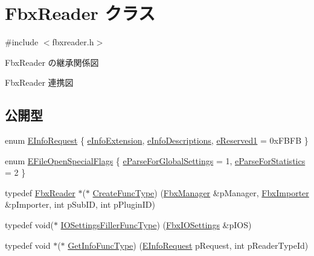\hypertarget{class_fbx_reader}{}\section{Fbx\+Reader クラス}
\label{class_fbx_reader}


{\ttfamily \#include $<$fbxreader.\+h$>$}



Fbx\+Reader の継承関係図


Fbx\+Reader 連携図
\subsection*{公開型}
\begin{DoxyCompactItemize}
\item 
enum \hyperlink{class_fbx_reader_a33badbb2641958ab0772ec2c06a71e11}{E\+Info\+Request} \{ \hyperlink{class_fbx_reader_a33badbb2641958ab0772ec2c06a71e11a03189cefb5f6d784e3af3760f4c89ebd}{e\+Info\+Extension}, 
\hyperlink{class_fbx_reader_a33badbb2641958ab0772ec2c06a71e11a6bc70d273a72ac7b0ac1ff679da40192}{e\+Info\+Descriptions}, 
\hyperlink{class_fbx_reader_a33badbb2641958ab0772ec2c06a71e11a347956bc041cb7614b8a9be1b388e4c2}{e\+Reserved1} = 0x\+F\+B\+FB
 \}
\item 
enum \hyperlink{class_fbx_reader_a1a14bd907bcda7dd48ba9b0a6236b7b8}{E\+File\+Open\+Special\+Flags} \{ \hyperlink{class_fbx_reader_a1a14bd907bcda7dd48ba9b0a6236b7b8a916239cfabb05bb13e64fab696226011}{e\+Parse\+For\+Global\+Settings} = 1, 
\hyperlink{class_fbx_reader_a1a14bd907bcda7dd48ba9b0a6236b7b8a31ba0d93719d2c2670ef2323447a8041}{e\+Parse\+For\+Statistics} = 2
 \}
\item 
typedef \hyperlink{class_fbx_reader}{Fbx\+Reader} $\ast$($\ast$ \hyperlink{class_fbx_reader_a83acaa910ced3876e5e232ff17f62c45}{Create\+Func\+Type}) (\hyperlink{class_fbx_manager}{Fbx\+Manager} \&p\+Manager, \hyperlink{class_fbx_importer}{Fbx\+Importer} \&p\+Importer, int p\+Sub\+ID, int p\+Plugin\+ID)
\item 
typedef void($\ast$ \hyperlink{class_fbx_reader_aa8d17b6ac89ea7229a3a1510fbccec73}{I\+O\+Settings\+Filler\+Func\+Type}) (\hyperlink{class_fbx_i_o_settings}{Fbx\+I\+O\+Settings} \&p\+I\+OS)
\item 
typedef void $\ast$($\ast$ \hyperlink{class_fbx_reader_a86477804a6ed54e7f99a1887aa50f256}{Get\+Info\+Func\+Type}) (\hyperlink{class_fbx_reader_a33badbb2641958ab0772ec2c06a71e11}{E\+Info\+Request} p\+Request, int p\+Reader\+Type\+Id)
\end{DoxyCompactItemize}
